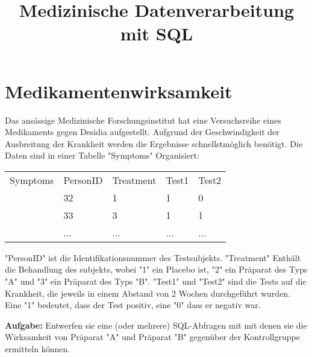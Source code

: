 \documentclass[]{article}
\begin{document}
\title{Medizinische Datenverarbeitung mit SQL}
\maketitle

\section*{Medikamentenwirksamkeit}

Das ansässige Medizinische Forschungsinstitut hat eine Versuchsreihe eines Medikaments gegen Desidia aufgestellt. Aufgrund der Geschwindigkeit der Ausbreitung der Krankheit werden die Ergebnisse schnellstmöglich benötigt. 
Die Daten sind in einer Tabelle "Symptoms" Organisiert:\\

\begin{tabular}{lllll}
\multicolumn{1}{l|}{Symptoms} & \multicolumn{1}{l|}{PersonID} & \multicolumn{1}{l|}{Treatment} & \multicolumn{1}{l|}{Test1} & \multicolumn{1}{l|}{Test2} \\ \cline{2-5} 
                              & 32                            & 1                              & 1                          & 0                          \\
                              & 33                            & 3                              & 1                          & 1                          \\
                              & ...                           & ...                            & ...                        & ...                       
\end{tabular}

"PersonID" ist die Identifikationsnummer des Testsubjekts. "Treatment" Enthält die Behandlung des subjekts, wobei "1" ein Placebo ist, "2" ein Präparat des Typs "A" und "3" ein Präparat des Typs "B". "Test1" und "Test2" sind die Tests auf die Krankheit, die jeweils in einem Abstand von 2 Wochen durchgeführt wurden. Eine "1" bedeutet, dass der Test positiv, eine "0" dass er negativ war. 

\textbf{Aufgabe:} Entwerfen sie eine (oder mehrere) SQL-Abfragen mit mit denen sie die Wirksamkeit von Präparat "A" und Präparat "B" gegenüber der Kontrollgruppe ermitteln können.
\end{document}

